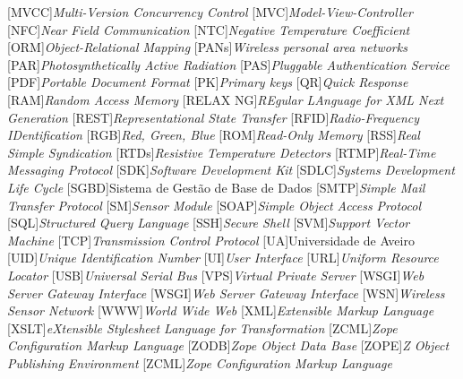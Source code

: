 \begin{multicols}{2}
\begin{acronym}[RELAX NG]
	[MVCC]{\textit{Multi-Version Concurrency Control}}
	[MVC]{\textit{Model-View-Controller}}
	[NFC]{\textit{Near Field Communication}}
	[NTC]{\textit{Negative Temperature Coefficient}}
	[ORM]{\textit{Object-Relational Mapping}}
	[PANs]{\textit{Wireless personal area networks}}
	[PAR]{\textit{Photosynthetically Active Radiation}}
	[PAS]{\textit{Pluggable Authentication Service}}
	[PDF]{\textit{Portable Document Format}}
	[PK]{\textit{Primary keys}}
	[QR]{\textit{Quick Response}}
	[RAM]{\textit{Random Access Memory}}
	[RELAX NG]{\textit{REgular LAnguage for XML Next Generation}}
	[REST]{\textit{Representational State Transfer}}
	[RFID]{\textit{Radio-Frequency IDentification}}
	[RGB]{\textit{Red, Green, Blue}}
	[ROM]{\textit{Read-Only Memory}}
	[RSS]{\textit{Real Simple Syndication}}
	[RTDs]{\textit{Resistive Temperature Detectors}}
	[RTMP]{\textit{Real-Time Messaging Protocol}}
	[SDK]{\textit{Software Development Kit}}
	[SDLC]{\textit{Systems Development Life Cycle}}
	[SGBD]{Sistema de Gestão de Base de Dados}
	[SMTP]{\textit{Simple Mail Transfer Protocol}}
	[SM]{\textit{Sensor Module}}
	[SOAP]{\textit{Simple Object Access Protocol}}
	[SQL]{\textit{Structured Query Language}}
	[SSH]{\textit{Secure Shell}}
	[SVM]{\textit{Support Vector Machine}}
	[TCP]{\textit{Transmission Control Protocol}}
	[UA]{Universidade de Aveiro}
	[UID]{\textit{Unique Identification Number}}
	[UI]{\textit{User Interface}}
	[URL]{\textit{Uniform Resource Locator}}
	[USB]{\textit{Universal Serial Bus}}
	[VPS]{\textit{Virtual Private Server }}
	[WSGI]{\textit{Web Server Gateway Interface }}
	[WSGI]{\textit{Web Server Gateway Interface}}
	[WSN]{\textit{Wireless Sensor Network}}
	[WWW]{\textit{World Wide Web}}
	[XML]{\textit{Extensible Markup Language}}
	[XSLT]{\textit{eXtensible Stylesheet Language for Transformation}}
	[ZCML]{\textit{Zope Configuration Markup Language}}
	[ZODB]{\textit{Zope Object Data Base}}
	[ZOPE]{\textit{Z Object Publishing Environment}}
	[ZCML]{\textit{Zope Configuration Markup Language}}
	
\end{acronym}

\end{multicols}

